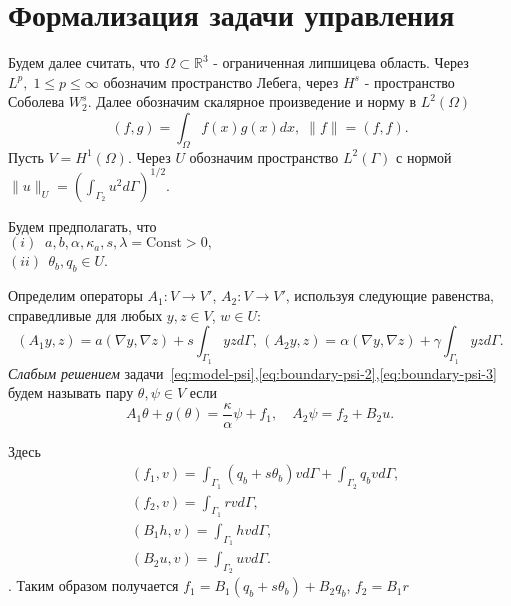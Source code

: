 \section{Формализация задачи управления}\label{sec:formalization}
Будем далее считать, что $\Omega \subset \mathbb{R}^3$ - ограниченная липшицева область.
Через $L^p, \; 1 \leq p \leq \infty$ обозначим пространство Лебега, через $H^s$ - пространство Соболева $W^s_2$.
Далее обозначим скалярное произведение и норму в $L^2(\Omega)$
\[
    (f, g) = \int_\Omega f(x)g(x)dx, \; \| f \| = (f, f).
\]
Пусть $V = H^1(\Omega)$.
Через $U$ обозначим пространство $L^2(\Gamma)$ с нормой
$\|u\|_{U} = \left(\int_{\Gamma_2} u^2 d\Gamma\right)^{1/2}$.

Будем предполагать, что\\
$(i) \;\; a, b,\alpha,\kappa_a, s, \lambda = \textrm{Const} > 0,$ \\
$(ii) \;\, \theta_b, q_b \in U$.

Определим операторы $A_1\colon V \to V'$, $A_2\colon V \to V'$, используя
следующие равенства, справедливые для любых $y,z \in V$, $w\in U$:
\[
    (A_1 y,z) = a(\nabla y, \nabla z) + s\int_{\Gamma_1} yz d\Gamma, \,
    (A_2 y, z) = \alpha (\nabla y, \nabla z) + \gamma \int_{\Gamma_1} yz d\Gamma.
\]
\textit{Слабым решением} задачи~\eqref{eq:model-psi},\eqref{eq:boundary-psi-2},\eqref{eq:boundary-psi-3}
будем называть пару $\theta, \psi \in V$ если
\begin{equation}
    \label{eq:weak}
    A_1\theta  + g\left( \theta \right) = \frac{\kappa}{\alpha} \psi + f_1, \quad
    A_2\psi = f_2 + B_2 u.
\end{equation}

Здесь
\begin{align*}
 & (f_1, v) = \int_{\Gamma_1} (q_b + s \theta_b) v d\Gamma + \int_{\Gamma_2} q_b v d\Gamma, \\
 & (f_2, v) = \int_{\Gamma_1} r v d\Gamma, \\
 & (B_1 h, v) = \int_{\Gamma_1} h v d\Gamma, \\
 & (B_2 u, v) = \int_{\Gamma_2} u v d\Gamma.
\end{align*}.
Таким образом получается $f_1 = B_1 (q_b + s \theta_b) + B_2 q_b$, $f_2 = B_1 r$

